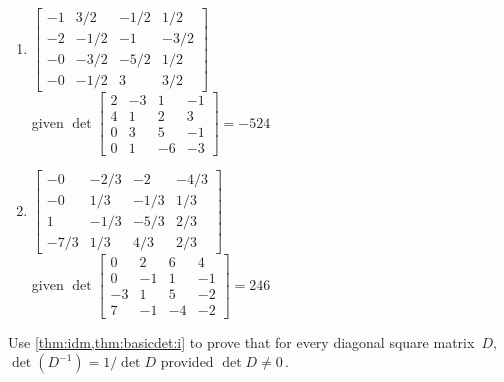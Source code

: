 \begin{exercise}
\begin{enumerate}
\item \(\begin{bmatrix} -1&3/2&-1/2&1/2
\\-2&-1/2&-1&-3/2
\\-0&-3/2&-5/2&1/2
\\-0&-1/2&3&3/2 \end{bmatrix}\)
\\given \(\det\begin{bmatrix} 2&-3&1&-1
\\4&1&2&3
\\0&3&5&-1
\\0&1&-6&-3 \end{bmatrix}= -524 \)

\item \(\begin{bmatrix} -0&-2/3&-2&-4/3
\\-0&1/3&-1/3&1/3
\\1&-1/3&-5/3&2/3
\\-7/3&1/3&4/3&2/3 \end{bmatrix}\)
\\given \(\det\begin{bmatrix} 0&2&6&4
\\0&-1&1&-1
\\-3&1&5&-2
\\7&-1&-4&-2 \end{bmatrix}= 246 \)


\end{enumerate}
\end{exercise}




\begin{exercise} 
Use \cref{thm:idm,thm:basicdet:i} to prove that for every diagonal square matrix~\(D\), \(\det(D^{-1})=1/\det D\) provided \(\det D\neq 0\)\,.
\end{exercise}



